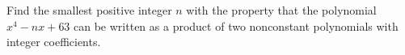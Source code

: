 Find the smallest positive integer $ n$ with the property that the polynomial $ x^4 - nx + 63$ can be written as a product of two nonconstant polynomials with integer coefficients.
